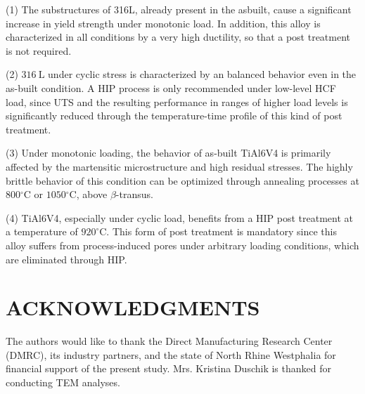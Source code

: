 \documentclass[10pt]{article}
\begin{document}
(1) The substructures of 316L, already present in the asbuilt, cause a significant increase in yield strength under monotonic load. In addition, this alloy is characterized in all conditions by a very high ductility, so that a post treatment is not required.

(2) $316 \mathrm{~L}$ under cyclic stress is characterized by an balanced behavior even in the as-built condition. A HIP process is only recommended under low-level HCF load, since UTS and the resulting performance in ranges of higher load levels is significantly reduced through the temperature-time profile of this kind of post treatment.

(3) Under monotonic loading, the behavior of as-built TiAl6V4 is primarily affected by the martensitic microstructure and high residual stresses. The highly\\
brittle behavior of this condition can be optimized through annealing processes at $800{ }^{\circ} \mathrm{C}$ or $1050{ }^{\circ} \mathrm{C}$, above $\beta$-transus.

(4) TiAl6V4, especially under cyclic load, benefits from a HIP post treatment at a temperature of $920^{\circ} \mathrm{C}$. This form of post treatment is mandatory since this alloy suffers from process-induced pores under arbitrary loading conditions, which are eliminated through HIP.

\section*{ACKNOWLEDGMENTS}
The authors would like to thank the Direct Manufacturing Research Center (DMRC), its industry partners, and the state of North Rhine Westphalia for financial support of the present study. Mrs. Kristina Duschik is thanked for conducting TEM analyses.
\end{document}
